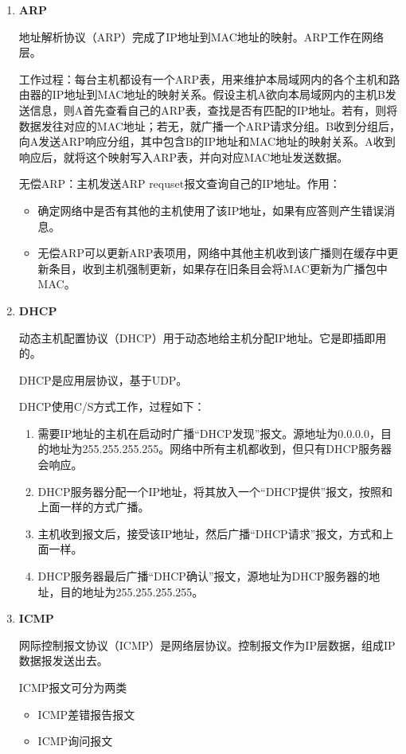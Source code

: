 \documentclass[12pt, a4paper, oneside]{ctexart}
\begin{document}
\begin{enumerate}
    \item {\bf ARP}
    
    地址解析协议（ARP）完成了IP地址到MAC地址的映射。ARP工作在网络层。

    工作过程：每台主机都设有一个ARP表，用来维护本局域网内的各个主机和路由器的IP地址到MAC地址的映射关系。假设主机A欲向本局域网内的主机B发送信息，则A首先查看自己的ARP表，查找是否有匹配的IP地址。若有，则将数据发往对应的MAC地址；若无，就广播一个ARP请求分组。B收到分组后，向A发送ARP响应分组，其中包含B的IP地址和MAC地址的映射关系。A收到响应后，就将这个映射写入ARP表，并向对应MAC地址发送数据。
    
    无偿ARP：主机发送ARP requset报文查询自己的IP地址。作用：
    \begin{itemize}
        \item 确定网络中是否有其他的主机使用了该IP地址，如果有应答则产生错误消息。
        \item 无偿ARP可以更新ARP表项用，网络中其他主机收到该广播则在缓存中更新条目，收到主机强制更新，如果存在旧条目会将MAC更新为广播包中MAC。
    \end{itemize}

    \item {\bf DHCP}
    
    动态主机配置协议（DHCP）用于动态地给主机分配IP地址。它是即插即用的。
    
    DHCP是应用层协议，基于UDP。

    DHCP使用C/S方式工作，过程如下：
    \begin{enumerate}
        \item 需要IP地址的主机在启动时广播“DHCP发现”报文。源地址为0.0.0.0，目的地址为255.255.255.255。网络中所有主机都收到，但只有DHCP服务器会响应。
        \item DHCP服务器分配一个IP地址，将其放入一个“DHCP提供”报文，按照和上面一样的方式广播。
        \item 主机收到报文后，接受该IP地址，然后广播“DHCP请求”报文，方式和上面一样。
        \item DHCP服务器最后广播“DHCP确认”报文，源地址为DHCP服务器的地址，目的地址为255.255.255.255。
    \end{enumerate}

    \item {\bf ICMP}
    
    网际控制报文协议（ICMP）是网络层协议。控制报文作为IP层数据，组成IP数据报发送出去。

    ICMP报文可分为两类
    \begin{itemize}
        \item ICMP差错报告报文
        \item ICMP询问报文
    \end{itemize}


\end{enumerate}
\end{document}
